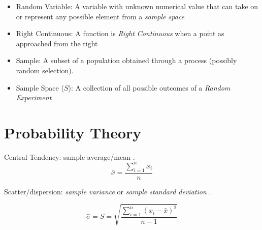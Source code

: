 \documentclass[12pt]{article}
\begin{document}
\begin{itemize}
\item Random Variable: A variable with unknown numerical value that can take on or represent any possible element from a \emph{sample space} \cite[p.10]{classnotes.3}

\item Right Continuous: A function is \emph{Right Continuous} when a point as approached from the right \cite[p.13]{classnotes.3}

\item Sample: A subset of a population obtained through a process (possibly random selection). \cite[p.9]{classnotes.1}

\item Sample Space ($S$): A collection of all possible outcomes of a \emph{Random Experiment} \cite[p.16]{classnotes.1}

\end{itemize}

\newpage

\section*{Probability Theory}

Central Tendency: sample average/mean \cite[p.14]{classnotes.1}.
$$\bar{x}=\frac{\sum\limits_{i=1}^{n} x_i}{n}$$

Scatter/dispersion: \emph{sample variance} or \emph{sample standard deviation} \cite[p.14]{classnotes.1}.

$$\hat{\sigma}=S=\sqrt{\frac{\sum\limits_{i=1}^{n}(x_i-\bar{x})^2}{n-1}}$$
\end{document}
